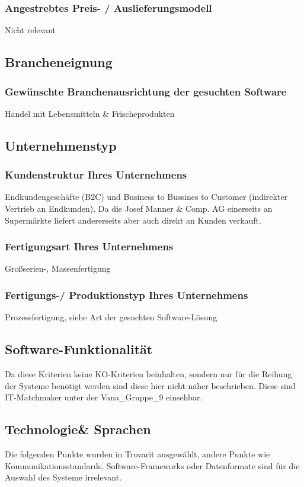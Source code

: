 \subsubsection{Angestrebtes Preis- / Auslieferungsmodell}
Nicht relevant

\subsection{Brancheneignung}
\subsubsection{Gewünschte Branchenausrichtung der gesuchten Software}
Handel mit Lebensmitteln \& Frischeprodukten

\subsection{Unternehmenstyp}
\subsubsection{Kundenstruktur Ihres Unternehmens}
Endkundengeschäfte (B2C) und Business to Bussines to Customer (indirekter Vertrieb an Endkunden). Da die Josef Manner \& Comp. AG einerseits an Supermärkte liefert andererseits aber auch direkt an Kunden verkauft.
\subsubsection{Fertigungsart Ihres Unternehmens}
Großserien-, Massenfertigung

\subsubsection{Fertigungs-/ Produktionstyp Ihres Unternehmens}
Prozessfertigung, siehe Art der gesuchten Software-Lösung

\subsection{Software-Funktionalität}
Da diese Kriterien keine KO-Kriterien beinhalten, sondern nur für die Reihung der Systeme benötigt werden sind diese hier nicht näher beschrieben. Diese sind IT-Matchmaker unter der Vana\_Gruppe\_9 einsehbar.


\subsection{Technologie\& Sprachen}
Die folgenden Punkte wurden in Trovarit ausgewählt, andere Punkte wie Kommunikationsstandards, Software-Frameworks oder Datenformate sind für die Auswahl des Systeme irrelevant.
